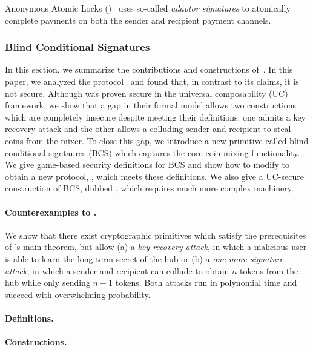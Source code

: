 Anonymous Atomic Locks (\AAL)~\cite{SP:TaiMorMaf21} uses so-called \emph{adaptor signatures} to atomically complete payments on both the sender and recipient payment channels.

\subsubsection{Blind Conditional Signatures}
In this section, we summarize the contributions and constructions of~\cite{CCS:GMMMTT22}. In this paper, we analyzed the \AAL protocol~\cite{SP:TaiMorMaf21} and found that, in contrast to its claims, it is not secure. Although \AAL was proven secure in the universal composability (UC)~\cite{FOCS:Canetti01} framework, we show that a gap in their formal model allows two constructions which are completely insecure despite meeting their definitions: one admits a key recovery attack and the other allows a colluding sender and recipient to steal coins from the mixer. To close this gap, we introduce a new primitive called blind conditional signtaures (BCS) which captures the core coin mixing functionality. We give game-based security definitions for BCS and show how to modify \AAL to obtain a new protocol, \AALplus, which meets these definitions. We also give a UC-secure construction of BCS, dubbed \AALUC, which requires much more complex machinery. 

\paragraph{Counterexamples to \AAL.} We show that there exist cryptographic primitives which satisfy the prerequisites of \AAL's main theorem, but allow (a) a \emph{key recovery attack}, in which a malicious user is able to learn the long-term secret of the hub or (b) a \emph{one-more signature attack}, in which a sender and recipient can collude to obtain $n$ tokens from the hub while only sending $n-1$ tokens. Both attacks run in polynomial time and succeed with overwhelming probability. 

\paragraph{Definitions.} 

\paragraph{Constructions.} 

